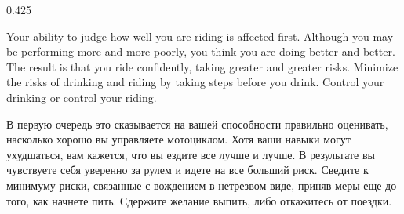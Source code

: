 \begin{langblock}{0.425}
	\begin{eng}
	
	Your ability to judge how well you are riding is affected first.  Although you may be performing more and more poorly, you think you are doing better and better. The result is that you ride confidently, taking greater and greater risks.  Minimize the risks of drinking and riding by taking steps before you drink. Control your drinking or control your riding.
	\end{eng}
	\begin{rus}
		
		В первую очередь это сказывается на вашей способности правильно оценивать, насколько хорошо вы управляете мотоциклом. Хотя ваши навыки могут ухудшаться, вам кажется, что вы ездите все лучше и лучше. В результате вы чувствуете себя уверенно за рулем и идете на все больший риск. Сведите к минимуму риски, связанные с вождением в нетрезвом виде, приняв меры еще до того, как начнете пить. Сдержите желание выпить, либо откажитесь от поездки.
\end{rus}
\end{langblock}

\clearpage
{}



